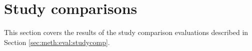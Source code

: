 \section{Study comparisons}
\label{sec:res:studycomp}
This section covers the results of the study comparison evaluations described in Section \ref{sec:meth:eval:studycomp}. 


